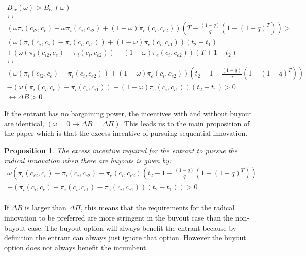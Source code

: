 \documentclass[11pt]{article}
\newtheorem{proposition}{Proposition}
\begin{document}
\begin{align*}
B_{er}(\omega) > B_{es}(\omega) \\
\leftrightarrow \\
\left(\omega\pi_{i}(c_{i2},c_{e})-\omega \pi_{i}(c_{i},c_{e2})+(1-\omega)\pi_{e}(c_{i},c_{e2}) \right) \left( T - \frac{(1-q)}{q} \left( 1-(1-q)^T \right) \right)> \\ 
(\omega(\pi_i(c_i,c_{e})-\pi_i(c_i,c_{i1}))+(1-\omega)\pi_e(c_i,c_{i1}))(t_2-t_1) \\
+(\omega(\pi_i(c_{i2},c_e)- \pi_i(c_{i},c_{e2}))+(1-\omega)\pi_e(c_{i},c_{e2}))(T+1-t_2) \\
\leftrightarrow \\
\left(\omega (\pi_{i}(c_{i2},c_{e})- \pi_{i}(c_{i},c_{e2}))+(1-\omega)\pi_{e}(c_{i},c_{e2}) \right) \left( t_2-1 - \frac{(1-q)}{q} \left( 1-(1-q)^T \right) \right)  \\
-(\omega(\pi_i(c_i,c_{e})-\pi_i(c_i,c_{i1}))+(1-\omega)\pi_e(c_i,c_{i1}))(t_2-t_1)>0 \\
\leftrightarrow
\Delta B > 0
\end{align*}

If the entrant has no bargaining power, the incentives with and without buyout are identical, $(\omega=0 \rightarrow \Delta B = \Delta \Pi)$. This leads us to the main proposition of the paper which is that the excess incentive of pursuing sequential innovation. 

\begin{proposition} \label{excessincentive}
The excess incentive required for the entrant to pursue the radical innovation when there are buyouts is given by: 
\begin{align*}
\omega \left(  \pi_{i}(c_{i2},c_{e})- \pi_{i}(c_{i},c_{e2})-\pi_{e}(c_{i},c_{e2})  \left( t_2-1  - \frac{(1-q)}{q} \left( 1-(1-q)^T \right) \right) \right. \\
-\left.(\pi_i(c_i,c_{e})-\pi_i(c_i,c_{e1})-\pi_e(c_i,c_{e1}))(t_2-t_1) \right)  >0 \\
\end{align*}
\end{proposition}


If $\Delta B$ is larger than $\Delta \Pi$, this means that the requirements for the radical innovation to be preferred are more stringent in the buyout case than the non-buyout case. The buyout option will always benefit the entrant because by definition the entrant can always just ignore that option. However the buyout option does not always benefit the incumbent. 
\end{document}
